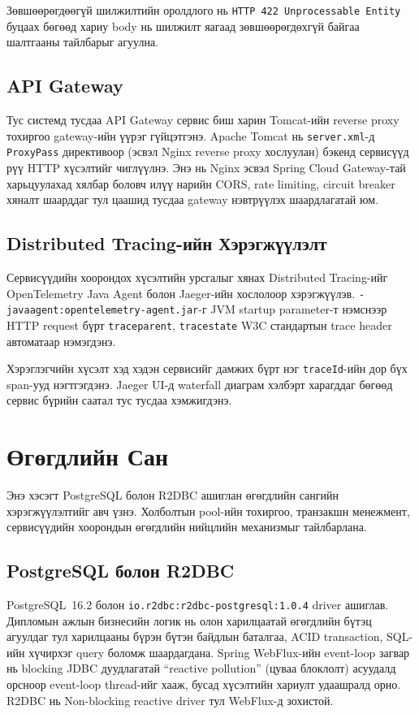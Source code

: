 Зөвшөөрөгдөөгүй шилжилтийн оролдлого нь \texttt{HTTP 422 Unprocessable
Entity} буцаах бөгөөд хариу body нь шилжилт яагаад зөвшөөрөгдөхгүй
байгаа шалтгааны тайлбарыг агуулна.

\subsection{API Gateway}

Тус системд тусдаа API Gateway сервис биш харин Tomcat-ийн
reverse proxy тохиргоо gateway-ийн үүрэг гүйцэтгэнэ. Apache Tomcat
нь \texttt{server.xml}-д \texttt{ProxyPass} директивоор (эсвэл Nginx
reverse proxy хослуулан) бэкенд сервисүүд рүү HTTP хүсэлтийг
чиглүүлнэ. Энэ нь Nginx эсвэл Spring Cloud Gateway-тай харьцуулахад
хялбар боловч илүү нарийн CORS, rate limiting, circuit breaker
хяналт шаарддаг тул цаашид тусдаа gateway нэвтрүүлэх шаардлагатай юм.

\subsection{Distributed Tracing-ийн Хэрэгжүүлэлт}

Сервисүүдийн хоорондох хүсэлтийн урсгалыг хянах Distributed Tracing-ийг
OpenTelemetry Java Agent болон Jaeger-ийн хослолоор хэрэгжүүлэв.
\texttt{-javaagent:opentelemetry-agent.jar}-г JVM startup parameter-т 
нэмснээр HTTP request бүрт
\texttt{traceparent}, \texttt{tracestate} W3C стандартын trace header
автоматаар нэмэгдэнэ.

Хэрэглэгчийн хүсэлт хэд хэдэн сервисийг дамжих бүрт нэг
\texttt{traceId}-ийн дор бүх span-ууд нэгтгэгдэнэ. Jaeger UI-д
waterfall диаграм хэлбэрт харагддаг бөгөөд сервис бүрийн саатал тус тусдаа хэмжигдэнэ.
\section{Өгөгдлийн Сан}
Энэ хэсэгт PostgreSQL болон R2DBC ашиглан өгөгдлийн сангийн хэрэгжүүлэлтийг авч үзнэ. Холболтын pool-ийн тохиргоо, транзакшн менежмент, сервисүүдийн хоорондын өгөгдлийн нийцлийн механизмыг тайлбарлана.

\subsection{PostgreSQL болон R2DBC}

PostgreSQL~16.2 болон
\texttt{io.r2dbc:r2dbc-postgresql:1.0.4} driver ашиглав.
Дипломын ажлын бизнесийн логик нь олон
харилцаатай өгөгдлийн бүтэц агуулдаг
тул харилцааны бүрэн бүтэн байдлын баталгаа,
ACID transaction, SQL-ийн хүчирхэг query боломж шаардагдана. Spring WebFlux-ийн event-loop
загвар нь blocking JDBC дуудлагатай ``reactive pollution'' (цуваа
блоклолт) асуудалд орсноор event-loop thread-ийг
хааж, бусад хүсэлтийн хариулт удаашралд орно. R2DBC нь Non-blocking
reactive driver тул WebFlux-д зохистой.

